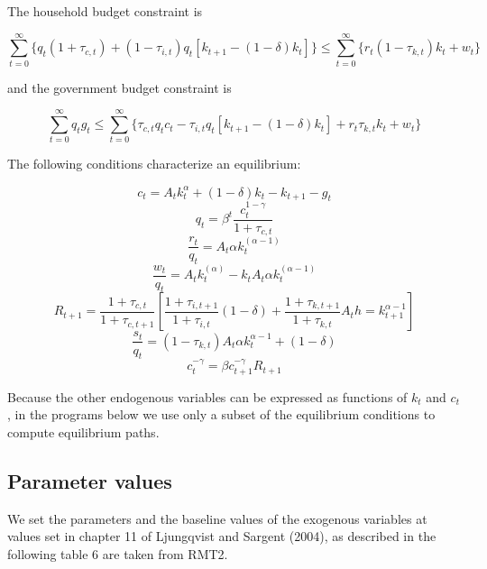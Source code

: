 \documentclass[a4paper,12pt]{scrartcl} %
\begin{document}
The household budget constraint is

$$\sum_{t=0}^{\infty}\{q_t(1+\tau_{c,t})+(1-\tau_{i,t})q_t[k_{t+1}-(1-\delta)k_t]\}\le \sum_{t=0}^{\infty}\{r_t(1-\tau_{k,t})k_t+w_t\}$$

and the government budget constraint is

$$\sum_{t=0}^{\infty}q_tg_t\le \sum_{t=0}^{\infty}\{\tau_{c,t}q_tc_t-\tau_{i,t}q_t[k_{t+1}-(1-\delta)k_t]+r_t\tau_{k,t}k_t+w_t\}$$

The following conditions characterize an equilibrium:

\begin{equation}\label{7}
   c_t=A_tk_t^{\alpha}+(1-\delta)k_t-k_{t+1}-g_t
\end{equation}
\begin{equation}\label{8}
   q_t=\beta^t\frac{c_t^{1-\gamma}}{1+\tau_{c,t}}
\end{equation}
\begin{equation}\label{9}
   \frac{r_t}{q_t}=A_t\alpha k_t^(\alpha-1)
\end{equation}
\begin{equation}\label{10}
    \frac{w_t}{q_t}=A_tk_t^(\alpha)-k_tA_t\alpha k_t^(\alpha-1)
\end{equation}
\begin{equation}\label{11}
    R_{t+1}=\frac{1+\tau_{c,t}}{1+\tau_{c,t+1}}[\frac{1+\tau_{i,t+1}}{1+\tau_{i,t}}(1-\delta)+\frac{1+\tau_{k,t+1}}{1+\tau_{k,t}}A_th=k_{t+1}^{\alpha-1}]
\end{equation}
\begin{equation}\label{12}
    \frac{s_t}{q_t}=(1-\tau_{k,t})A_t\alpha k_t^{\alpha-1}+(1-\delta)
\end{equation}
\begin{equation}\label{13}
    c_t^{-\gamma}=\beta c_{t+1}^{-\gamma}R_{t+1}
\end{equation}

Because the other endogenous variables can be expressed as functions of $k_t$ and $c_t$, in the programs below we use only a subset of the equilibrium conditions to compute equilibrium paths.

\subsection{Parameter values}

We set the parameters and the baseline values of the exogenous variables at values set in chapter 11 of Ljungqvist and Sargent (2004), as described in the following table 6 are taken from RMT2.
\end{document}
